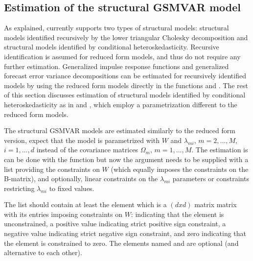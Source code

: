 \documentclass[nojss]{jss}
\begin{document}
\subsection{Estimation of the structural GSMVAR model}\label{sec:estim_structural}


As explained,  currently supports two types of structural models: structural models identified recursively by the lower triangular Cholesky decomposition and structural models identified by conditional heteroskedasticity. Recursive identification is assumed for reduced form models, and thus do not require any further estimation.  Generalized impulse response functions and generalized forecast error variance decompositions can be estimated for recursively identified models by using the reduced form models directly in the functions  and . The rest of this section discusses estimation of structural models identified by conditional heteroskedasticity as in \cite{Virolainen:2024} and \cite{Virolainen2:2021}, which employ a parametrization different to the reduced form models.

The structural GSMVAR models are estimated similarly to the reduced form version, expect that the model is parametrized with $W$ and $\lambda_{mi}$, $m=2,...,M$, $i=1,...,d$ instead of the covariance matrices $\Omega_{m}$, $m=1,...,M$. The estimation is can be done with the function  but now the argument  needs to be supplied with a list providing the constraints on $W$ (which equally imposes the constraints on the B-matrix), and optionally, linear constraints on the $\lambda_{mi}$ parameters or constraints restricting $\lambda_{mi}$ to fixed values.

The list  should contain at least the element  which is a $(dxd)$ matrix matrix with its entries imposing constraints on $W$:  indicating that the element is unconstrained, a positive value indicating strict positive sign constraint, a negative value indicating strict negative sign constraint, and zero indicating that the element is constrained to zero. The elements named  and  are optional (and alternative to each other).
\end{document}
